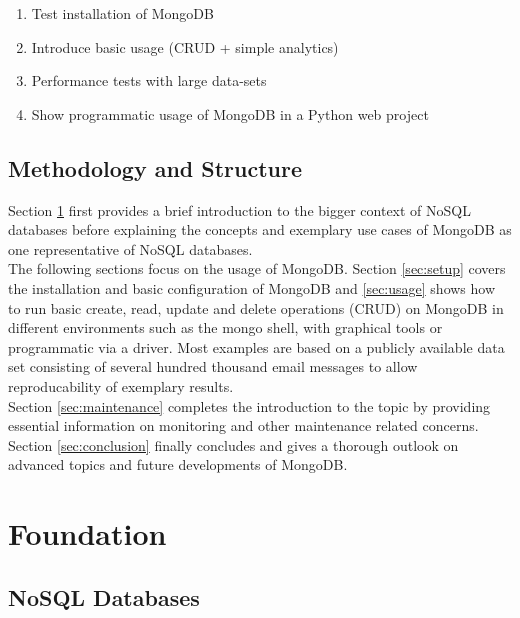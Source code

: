 \begin{enumerate}
  \item Test installation of MongoDB
  \item Introduce basic usage (CRUD + simple analytics)
  \item Performance tests with large data-sets
  \item Show programmatic usage of MongoDB in a Python web project
\end{enumerate}

\subsection{Methodology and Structure}
\label{sec:methodology}

Section \ref{sec:foundation} first provides a brief introduction to the bigger
context of NoSQL databases before explaining the concepts and exemplary use
cases of MongoDB as one representative of NoSQL databases.\\
The following sections focus on the usage of MongoDB. Section \ref{sec:setup}
covers the installation and basic configuration of MongoDB and
\autoref{sec:usage} shows how to run basic create, read, update and delete
operations (CRUD) on MongoDB in different environments such as the mongo shell,
with graphical tools or programmatic via a driver.
Most examples are based on a publicly available data set consisting of several
hundred thousand email messages to allow reproducability of exemplary
results.\\
Section \ref{sec:maintenance} completes the introduction to the topic by
providing essential information on monitoring and other maintenance related
concerns. Section \ref{sec:conclusion} finally concludes and gives a thorough
outlook on advanced topics and future developments of MongoDB.


\newpage

\section{Foundation}
\label{sec:foundation}



\subsection{NoSQL Databases}
\label{sec:nosql}

